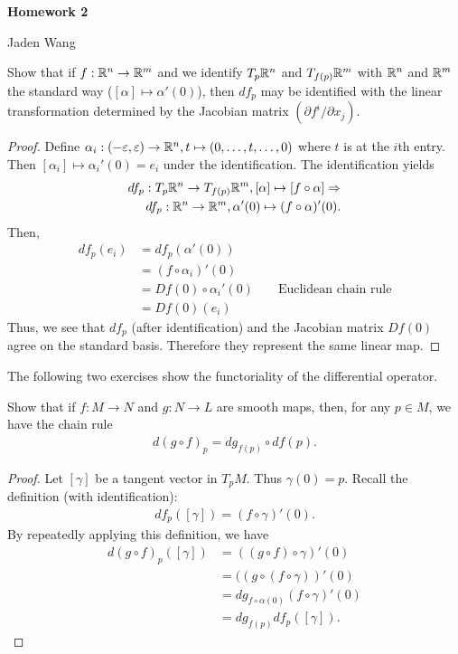 \documentclass[12pt]{article}
\begin{document}
\centerline {\textsf{\textbf{\LARGE{Homework 2}}}}
\centerline {Jaden Wang}
\vspace{.15in}

\begin{problem}[LN 5.8]
	Show that if $ f: \mathbb{R}^{n} \to \mathbb{R}^{m}$ and we identify $ T_p \mathbb{R}^{n}$ and $ T_{f(p)}\mathbb{R}^{m}$ with $ \mathbb{R}^{n}$ and $ \mathbb{R}^{m}$ the standard way ($ [ \alpha] \mapsto \alpha'(0)$), then $ df_p$ may be identified with the linear transformation determined by the Jacobian matrix $ (\partial f^{i}/ \partial x_j)$.
\end{problem}
\begin{proof}
	Define $ \alpha_i: (- \varepsilon, \varepsilon) \to \mathbb{R}^{n}, t\mapsto (0,\ldots,t,\ldots,0)$ where $ t$ is at the  $ i$th entry. Then  $ [ \alpha_i] \mapsto  \alpha_i'(0) = e_i$ under the identification. The identification yields
\begin{align*}
	df_p: T_p \mathbb{R}^{n} \to T_{f(p)} \mathbb{R}^{m}, [ \alpha] \mapsto [f \circ \alpha] \Rightarrow\\
	df_p : \mathbb{R}^{n} \to \mathbb{R}^{m}, \alpha'(0) \mapsto (f \circ \alpha)'(0).
\end{align*}
Then,
\begin{align*}
	df_p(e_i) &= df_p( \alpha'(0)) \\
	&= (f \circ \alpha_i)'(0) \\
	&= Df(0) \circ \alpha_i'(0) && \text{ Euclidean chain rule} \\
	&= Df(0)(e_i)
\end{align*}
Thus, we see that $ df_p$ (after identification) and the Jacobian matrix $ Df(0)$ agree on the standard basis. Therefore they represent the same linear map.
\end{proof}

The following two exercises show the functoriality of the differential operator.

\begin{problem}[LN 5.9]
Show that if $ f: M \to N$ and $ g:N \to L$ are smooth maps, then, for any $ p \in M$, we have the chain rule
\begin{align*}
	d(g \circ f)_p = d g_{f(p)} \circ df(p).
\end{align*}
\end{problem}
\begin{proof}
	Let $ [\gamma]$ be a tangent vector in $ T_pM$. Thus $ \gamma(0)=p$. Recall the definition (with identification):
\begin{align*}
	df_p( [ \gamma]) = (f \circ \gamma)'(0).
\end{align*}
By repeatedly applying this definition, we have
 \begin{align*}
	 d(g \circ f)_p ([ \gamma]) &= ((g \circ f) \circ \gamma)'(0)\\
				    &= ((g \circ (f \circ \gamma))'(0) \\
				    &= d g_{f \circ \alpha(0)} (f \circ \gamma)'(0) \\
				    &= d g_{f(p)} df_p([ \gamma]). 
\end{align*}
\end{proof}
\end{document}
